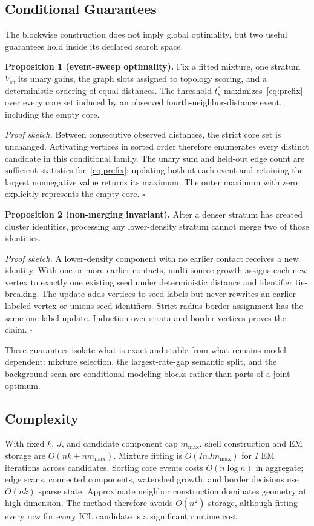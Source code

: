 \documentclass[conference]{IEEEtran}
\begin{document}
\subsection{Conditional Guarantees}
The blockwise construction does not imply global optimality, but two useful guarantees hold inside its declared search space.

\textbf{Proposition 1 (event-sweep optimality).} Fix a fitted mixture, one stratum $V_s$, its unary gains, the graph slots assigned to topology scoring, and a deterministic ordering of equal distances. The threshold $t_s^*$ maximizes~\eqref{eq:prefix} over every core set induced by an observed fourth-neighbor-distance event, including the empty core.

\emph{Proof sketch.} Between consecutive observed distances, the strict core set is unchanged. Activating vertices in sorted order therefore enumerates every distinct candidate in this conditional family. The unary sum and held-out edge count are sufficient statistics for~\eqref{eq:prefix}; updating both at each event and retaining the largest nonnegative value returns its maximum. The outer maximum with zero explicitly represents the empty core. $\square$

\textbf{Proposition 2 (non-merging invariant).} After a denser stratum has created cluster identities, processing any lower-density stratum cannot merge two of those identities.

\emph{Proof sketch.} A lower-density component with no earlier contact receives a new identity. With one or more earlier contacts, multi-source growth assigns each new vertex to exactly one existing seed under deterministic distance and identifier tie-breaking. The update adds vertices to seed labels but never rewrites an earlier labeled vertex or unions seed identifiers. Strict-radius border assignment has the same one-label update. Induction over strata and border vertices proves the claim. $\square$

These guarantees isolate what is exact and stable from what remains model-dependent: mixture selection, the largest-rate-gap semantic split, and the background scan are conditional modeling blocks rather than parts of a joint optimum.

\subsection{Complexity}
With fixed $k$, $J$, and candidate component cap $m_{\max}$, shell construction and EM storage are $O(nk+nm_{\max})$. Mixture fitting is $O(InJm_{\max})$ for $I$ EM iterations across candidates. Sorting core events costs $O(n\log n)$ in aggregate; edge scans, connected components, watershed growth, and border decisions use $O(nk)$ sparse state. Approximate neighbor construction dominates geometry at high dimension. The method therefore avoids $O(n^2)$ storage, although fitting every row for every ICL candidate is a significant runtime cost.
\end{document}
